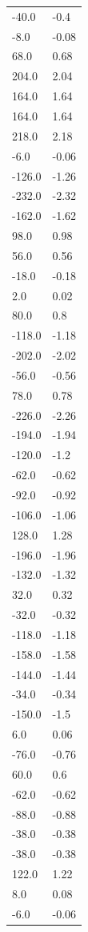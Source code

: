 \begin{longtable}{ll}
-40.0 & -0.4 \\
-8.0 & -0.08 \\
68.0 & 0.68 \\
204.0 & 2.04 \\
164.0 & 1.64 \\
164.0 & 1.64 \\
218.0 & 2.18 \\
-6.0 & -0.06 \\
-126.0 & -1.26 \\
-232.0 & -2.32 \\
-162.0 & -1.62 \\
98.0 & 0.98 \\
56.0 & 0.56 \\
-18.0 & -0.18 \\
2.0 & 0.02 \\
80.0 & 0.8 \\
-118.0 & -1.18 \\
-202.0 & -2.02 \\
-56.0 & -0.56 \\
78.0 & 0.78 \\
-226.0 & -2.26 \\
-194.0 & -1.94 \\
-120.0 & -1.2 \\
-62.0 & -0.62 \\
-92.0 & -0.92 \\
-106.0 & -1.06 \\
128.0 & 1.28 \\
-196.0 & -1.96 \\
-132.0 & -1.32 \\
32.0 & 0.32 \\
-32.0 & -0.32 \\
-118.0 & -1.18 \\
-158.0 & -1.58 \\
-144.0 & -1.44 \\
-34.0 & -0.34 \\
-150.0 & -1.5 \\
6.0 & 0.06 \\
-76.0 & -0.76 \\
60.0 & 0.6 \\
-62.0 & -0.62 \\
-88.0 & -0.88 \\
-38.0 & -0.38 \\
-38.0 & -0.38 \\
122.0 & 1.22 \\
8.0 & 0.08 \\
-6.0 & -0.06 \\

\end{longtable}
